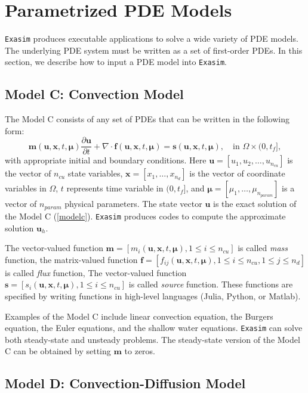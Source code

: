 \documentclass[11pt]{article}
\begin{document}
\section{Parametrized PDE Models}
\label{PDEmodels}

\texttt{Exasim} produces executable applications to solve a wide variety of PDE models. The underlying PDE system must be written as a set of first-order PDEs. In this section, we describe how to input a PDE model into \texttt{Exasim}. 


\subsection{Model C: Convection Model}

The Model C consists of any set of PDEs that can be written in the following form:
\begin{equation}
\label{modelc}
\bm m(\bm{u},\bm x,t, \bm \mu) \frac{\partial \bm{u}}{\partial t} + \nabla \cdot \bm{f}(\bm{u},\bm x,t, \bm \mu) = \bm s(\bm{u},\bm x,t, \bm \mu), \quad \mbox{in } \Omega \times (0, t_f], 
\end{equation}
with appropriate initial and boundary conditions. Here $\bm u = [u_1, u_2, \ldots, u_{n_{cu}}]$ is the vector of $n_{cu}$ state variables, $\bm x = [x_1,\dots,x_{n_d}]$ is the vector of coordinate variables in $\Omega$, $t$ represents time variable in $(0, t_f]$, and $\bm \mu = [\mu_1, \ldots, \mu_{n_{param}}]$ is a vector of $n_{param}$ physical parameters. The state vector $\bm u$ is the exact solution of the Model C (\ref{modelc}).  \texttt{Exasim} produces codes to compute the approximate solution $\bm u_h$.

The vector-valued function  $\bm m = [m_i(\bm u, \bm x, t, \bm \mu), 1 \le i \le n_{cu} ]$ is called {\em mass} function, the matrix-valued function $\bm f = [f_{ij}(\bm u, \bm x, t, \bm \mu), 1 \le i \le n_{cu}, 1 \le j \le n_d]$ is called {\em flux} function, The vector-valued function  $\bm s = [s_i(\bm u, \bm x, t, \bm \mu), 1 \le i \le n_{cu} ]$ is called {\em source} function. These functions are specified by writing functions in high-level languages (Julia, Python, or Matlab).

Examples of the Model C include linear convection equation, the Burgers equation, the Euler equations, and the shallow water equations. \texttt{Exasim} can solve both steady-state and unsteady problems. The steady-state version of the Model C can be obtained by setting $\bm m$ to zeros. 

\subsection{Model D: Convection-Diffusion Model}
\end{document}

